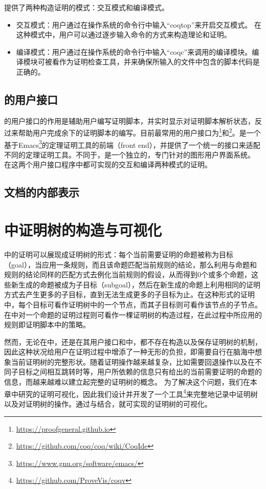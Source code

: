 提供了两种构造证明的模式：交互模式和编译模式。
\begin{itemize}
	\item 交互模式：用户通过在操作系统的命令行中输入“coqtop”来开启交互模式。
	在这种模式中，用户可以通过逐步输入命令的方式来构造理论和证明。
	\item 编译模式：用户通过在操作系统的命令行中输入“coqc”来调用的编译模块。编译模块可被看作为证明检查工具，并来确保所输入的文件中包含的脚本代码是正确的。
\end{itemize}

\subsection{的用户接口}
的用户接口的作用是辅助用户编写证明脚本，并实时显示对证明脚本解析状态，反过来帮助用户完成余下的证明脚本的编写。目前最常用的用户接口为\footnote{\url{https://proofgeneral.github.io}}和\footnote{\url{https://github.com/coq/coq/wiki/CoqIde}}。是一个基于Emacs\footnote{\url{https://www.gnu.org/software/emacs/}}的定理证明工具的前端（front end），并提供了一个统一的接口来适配不同的定理证明工具。不同于，是一个独立的，专门针对的图形用户界面系统。
在这两个用户接口程序中都可实现的交互和编译两种模式的证明。

\subsection{文档的内部表示}




\section{中证明树的构造与可视化}
中的证明可以展现成证明树的形式：每个当前需要证明的命题被称为目标（goal），当应用一条规则，而且该命题匹配当前规则的结论，那么利用与命题和规则的结论同样的匹配方式去例化当前规则的假设，从而得到0个或多个命题，这些新生成的命题被成为子目标（subgoal），然后在新生成的命题上利用相同的证明方式去产生更多的子目标，直到无法生成更多的子目标为止。在这种形式的证明中，每个目标可看作证明树中的一个节点，而其子目标则可看作该节点的子节点。在中对一个命题的证明过程则可看作一棵证明树的构造过程，在此过程中所应用的规则即证明脚本中的策略。

然而，无论在中，还是在其用户接口和中，都不存在构造以及保存证明树的机制，因此这种状况给用户在证明过程中增添了一种无形的负担，即需要自行在脑海中想象当前证明树的完整形状。随着证明操作越来越复杂，比如需要回退操作以及在不同子目标之间相互跳转时等，用户所依赖的信息只有给出的当前需要证明的命题的信息，而越来越难以建立起完整的证明树的概念。
为了解决这个问题，我们在本章中研究的证明可视化，因此我们设计并开发了一个工具\footnote{\url{https://github.com/ProveVis/coqv}}来完整地记录中证明树以及对证明树的操作。通过与结合，就可实现的证明树的可视化。

